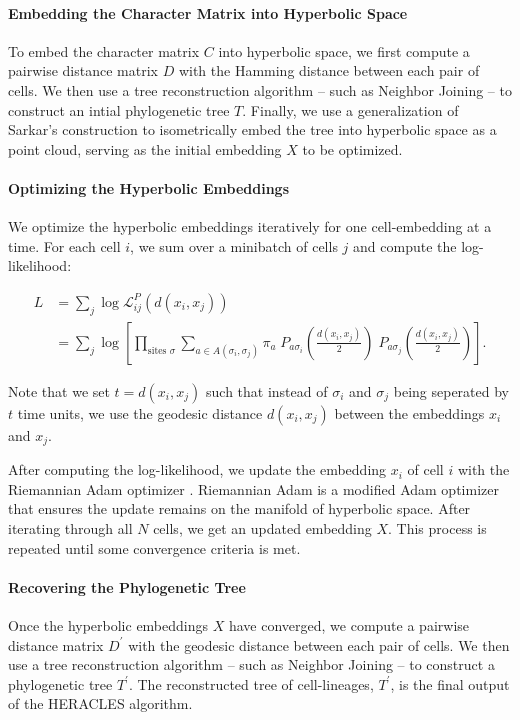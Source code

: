 \documentclass{article}
\begin{document}
\paragraph*{Embedding the Character Matrix into Hyperbolic Space} To embed the character matrix $C$ into hyperbolic space, we first compute a pairwise distance matrix $D$ with the Hamming distance between each pair of cells. We then use a tree reconstruction algorithm -- such as Neighbor Joining -- to construct an intial phylogenetic tree $T$. Finally, we use a generalization of Sarkar's construction \cite{sarkar2012low} \cite{sala2018representation} to isometrically embed the tree into hyperbolic space as a point cloud, serving as the initial embedding $X$ to be optimized.

\paragraph*{Optimizing the Hyperbolic Embeddings} We optimize the hyperbolic embeddings iteratively for one cell-embedding at a time. For each cell $i$, we sum over a minibatch of cells $j$ and compute the log-likelihood:

\begin{align}
  \label{eq:log-likelihood}
  L &= \sum_{j} \log \mathcal{L}_{ij}^P \left( d(x_i, x_j) \right) \\
  &= \sum_{j} \log \left[ \prod_{\textrm{sites } \sigma} \sum_{a \in A(\sigma_i, \sigma_j)} \pi_a \; P_{a \sigma_i} \left( \frac{ d(x_i, x_j)}{2} \right) \;   P_{a \sigma_j} \left( \frac{ d(x_i, x_j)}{2} \right) \right].
\end{align}

Note that we set $t=d(x_i, x_j)$ such that instead of $\sigma_i$ and $\sigma_j$ being seperated by $t$ time units, we use the geodesic distance $d(x_i, x_j)$ between the embeddings $x_i$ and $x_j$.

After computing the log-likelihood, we update the embedding $x_i$ of cell $i$ with the Riemannian Adam optimizer \cite{becigneul2018riemannian}. Riemannian Adam is a modified Adam optimizer \cite{kingma2014adam} that ensures the update remains on the manifold of hyperbolic space. After iterating through all $N$ cells, we get an updated embedding $X$. This process is repeated until some convergence criteria is met.

\paragraph*{Recovering the Phylogenetic Tree} Once the hyperbolic embeddings $X$ have converged, we compute a pairwise distance matrix $D^\prime$ with the geodesic distance between each pair of cells. We then use a tree reconstruction algorithm -- such as Neighbor Joining -- to construct a phylogenetic tree $T^\prime$. The reconstructed tree of cell-lineages, $T^\prime$, is the final output of the HERACLES algorithm.
\end{document}
